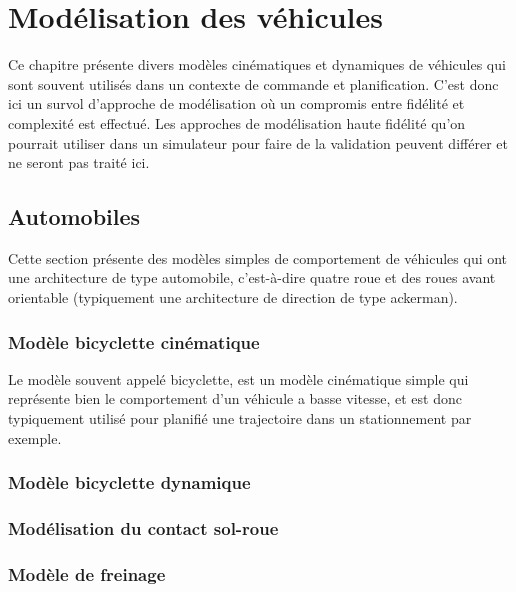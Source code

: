 \chapter{Modélisation des véhicules}

Ce chapitre présente divers modèles cinématiques et dynamiques de véhicules qui sont souvent utilisés dans un contexte de commande et planification. C'est donc ici un survol d'approche de modélisation où un compromis entre fidélité et complexité est effectué. Les approches de modélisation haute fidélité qu'on pourrait utiliser dans un simulateur pour faire de la validation peuvent différer et ne seront pas traité ici.

\section{Automobiles}

Cette section présente des modèles simples de comportement de véhicules qui ont une architecture de type automobile, c'est-à-dire quatre roue et des roues avant orientable (typiquement une architecture de direction de type ackerman).

\subsection{Modèle bicyclette cinématique}

Le modèle souvent appelé bicyclette, est un modèle cinématique simple qui représente bien le comportement d'un véhicule a basse vitesse, et est donc typiquement utilisé pour planifié une trajectoire dans un stationnement par exemple.


\subsection{Modèle bicyclette dynamique}


\subsection{Modélisation du contact sol-roue}


\subsection{Modèle de freinage}




